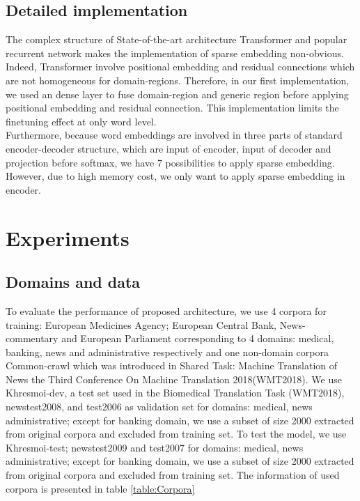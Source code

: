 \documentclass[11pt,a4paper]{article}
\begin{document}
\subsection{Detailed implementation}
The complex structure of State-of-the-art architecture Transformer \cite{NIPS2017_7181} and popular recurrent network \cite{bahdanau2014neural} makes the implementation of sparse embedding non-obvious. Indeed, Transformer involve positional embedding and residual connections which are not homogeneous for domain-regions. Therefore, in our first implementation, we used an dense layer to fuse domain-region and generic region before applying positional embedding and residual connection. This implementation limits the finetuning effect at only word level.\\
Furthermore, because word embeddings are involved in three parts of standard encoder-decoder structure, which are input of encoder, input of decoder and projection before softmax, we have 7 possibilities to apply sparse embedding. However, due to high memory cost, we only want to apply sparse embedding in encoder.
\section{Experiments}
\subsection{Domains and data}
To evaluate the performance of proposed architecture, we use 4 corpora for training: European Medicines Agency; European Central Bank, News-commentary and European Parliament \cite{Tiedemann2009RANLP5} corresponding to 4 domains: medical, banking, news and administrative  respectively and one non-domain corpora Common-crawl  which was introduced in Shared Task: Machine Translation of News the Third Conference On Machine Translation 2018(WMT2018). We use Khresmoi-dev, a test set used in the Biomedical Translation Task (WMT2018), newstest2008, and test2006 as validation set for domains: medical, news administrative; except for banking domain, we use a subset of size 2000 extracted from original corpora and excluded from training set. To test the model, we use Khresmoi-test; newstest2009 and test2007 for domains: medical, news administrative; except for banking domain, we use a subset of size 2000 extracted from original corpora and excluded from training set. The information of used corpora is presented in table \ref{table:Corpora}
\end{document}
